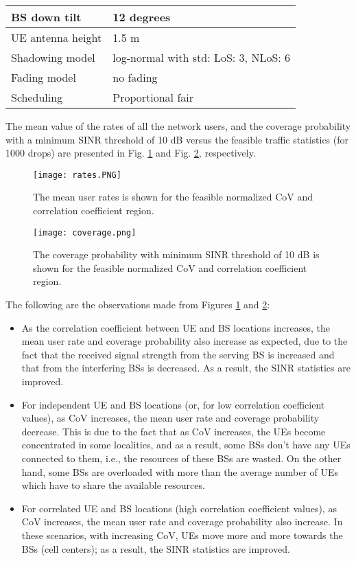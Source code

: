 \documentclass[journal]{IEEEtran}
\begin{document}
\begin{table}
\begin{tabular}{|m{4cm}|m{4cm}|}
    BS down tilt                & 12 degrees                                        \\ \hline
    UE antenna height           & 1.5 m                                             \\ \hline
    Shadowing model             & log-normal with std: LoS: 3, NLoS: 6               \\ \hline
    Fading model                & no fading                                         \\ \hline
    Scheduling                  & Proportional fair \cite{RS_XU_ICC09}              \\ \hline
    \end{tabular}
\end{table}

The mean value of the rates of all the network users, and the coverage probability with a minimum SINR threshold of 10 dB versus the feasible traffic statistics (for 1000 drops) are presented in Fig. \ref{fig:rates} and Fig. \ref{fig:coverage}, respectively.

\begin{figure}
\centering
\texttt{[image: rates.PNG]}
\caption{The mean user rates is shown for the feasible normalized CoV and correlation coefficient region.}
\label{fig:rates}
\end{figure}

\begin{figure}
\centering
\texttt{[image: coverage.png]}
\caption{The coverage probability with minimum SINR threshold of 10 dB is shown for the feasible normalized CoV and correlation coefficient region.}
\label{fig:coverage}
\end{figure}

The following are the observations made from Figures \ref{fig:rates} and \ref{fig:coverage}:
\begin{itemize}
\item As the correlation coefficient between UE and BS locations increases, the mean user rate and coverage probability also increase as expected, due to the fact that the received signal strength from the serving BS is increased and that from the interfering BSs is decreased. As a result, the SINR statistics are improved.
\item For independent UE and BS locations (or, for low correlation coefficient values), as CoV increases, the mean user rate and coverage probability decrease. This is due to the fact that as CoV increases, the UEs become concentrated in some localities, and as a result, some BSs don't have any UEs connected to them, i.e., the resources of these BSs are wasted. On the other hand, some BSs are overloaded with more than the average number of UEs which have to share the available resources.
\item For correlated UE and BS locations (high correlation coefficient values), as CoV increases, the mean user rate and coverage probability also increase. In these scenarios, with increasing CoV, UEs move more and more towards the BSs (cell centers); as a result, the SINR statistics are improved.
\end{itemize}
\end{document}
